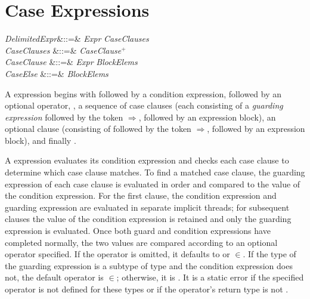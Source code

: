 %
%
%
%

\section{Case Expressions}

\begin{Grammar}
\emph{DelimitedExpr}&::=&
 \emph{Expr}   \emph{CaseClauses}
  \\

\emph{CaseClauses} &::=& \emph{CaseClause}$^+$\\

\emph{CaseClause} &::=& \emph{Expr} \EXP{\Rightarrow} \emph{BlockElems}\\

\emph{CaseElse} &::=&  \EXP{\Rightarrow} \emph{BlockElems}\\

\end{Grammar}

A  expression begins with 
followed by a condition expression, followed by an optional operator,
, a sequence of case clauses (each consisting
of a \emph{guarding expression} followed by the token $\Rightarrow$,
followed by an expression block), an optional
 clause (consisting of
 followed by the token $\Rightarrow$,
 followed by an expression block), and finally .

A  expression evaluates its condition expression and checks
each case clause to determine which case clause matches.  To find a
matched case clause, the guarding expression of each case clause is
evaluated in order and compared to the value of the condition
expression.  For the first clause, the condition expression and
guarding expression are evaluated in separate implicit threads; for
subsequent clauses the value of the condition expression is retained
and only the guarding expression is evaluated.  Once both guard and
condition expressions have completed normally, the two values are
compared according to an optional operator specified.  If the
operator is omitted, it defaults to \EXP{=} or $\in$.
If the type of the guarding expression is a subtype of type 
and the condition expression does not,
the default operator is $\in$;
otherwise, it is \EXP{=}.
It is a static error
if the specified operator is not defined for these types
or if the operator's return type is not .


